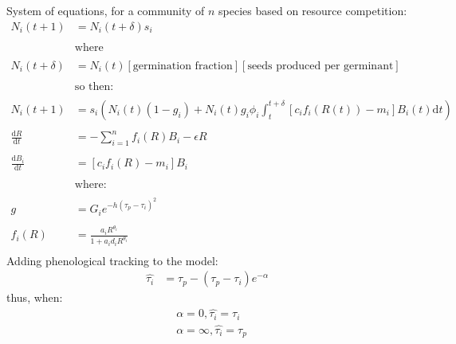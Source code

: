 \documentclass[11pt,a4paper,oneside]{article}
\begin{document}
\newpage
\noindent System of equations, for a community of \(n\) species based
on resource competition:
\begin{align*}
N_{i}(t+1) & = N_{i}(t+\delta)s_{i}
\\
\\
& \text{where}
\\
\\
N_{i}(t+\delta) & = N_{i}(t) [\text{germination fraction}][\text{seeds
  produced per germinant}]
\\
\\
& \text{so then:}
\\
\\
N_{i}(t+1) & =
s_{i}(N_{i}(t)(1-g_{i})+N_{i}(t)g_{i}\phi_{i}\int_t^{t+\delta}[c_{i}f_{i}(R(t))-m_{i}]B_{i}(t)\mathrm{d}t)
\\
\\
\frac{\mathrm{d}R}{\mathrm{d}t} & = - \sum_{i=1}^{n}f_{i}(R)B_{i} -\epsilon R
\\
\\
\frac{\mathrm{d}B_{i}}{\mathrm{d}t} &  = [c_{i}f_{i}(R) - m_{i}]B_{i}
\\
\\
& \text{where:} 
\\
\\
g & = G_{i}e^{-h(\tau_{p}-\tau_{i})^2}
\\
\\
f_{i}(R) & = \frac{a_{i}R^{\theta_{i}}}{1+a_{i}d_{i}R^{\theta_{i}}}
\\
\end{align*}
\noindent Adding phenological tracking to the model:
\begin{align*}
\hat{\tau_{i}} & = \tau_{p}-(\tau_{p}-\tau_{i})e^{-\alpha}
\end{align*}
\noindent thus, when:
\begin{align*}
& \alpha=0, \hat{\tau_{i}}=\tau_{i}
\\
& \alpha=\infty, \hat{\tau_{i}}=\tau_{p}
\end{align*}
\end{document}
